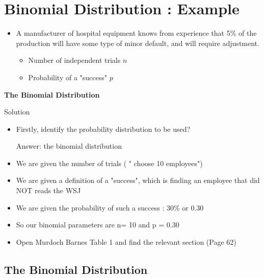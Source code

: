 \documentclass[]{article}
\begin{document}
\section{Binomial Distribution : Example}



\begin{itemize}
\item A manufacturer of hospital equipment knows from experience that 5\% of the production will have some type of minor default, and will require adjustment.

\begin{itemize}
\item Number of independent trials $n$

\item Probability of a "success" $p$

\end{itemize}
\end{itemize}







\textbf{The Binomial Distribution}

Solution
\begin{itemize}
\item Firstly, identify the probability distribution to be used?

Answer: the binomial distribution
\item 
We are given the number of trials ( " choose 10 employees")
\item 
We are given a definition of a "success", which is finding an employee that did NOT reads the WSJ

\item 
We are given the probability of such a success : 30\%  or 0.30

\item 
So our binomial parameters are n= 10 and p = 0.30

\item
Open Murdoch Barnes Table 1 and find the relevant section (Page 62)
\end{itemize}




\subsection{The Binomial Distribution}
\end{document}
